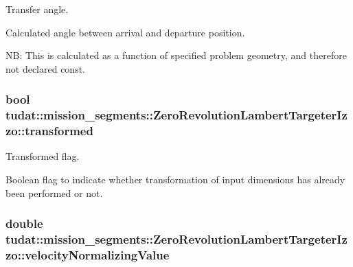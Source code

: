 Transfer angle. 

Calculated angle between arrival and departure position.

NB\+: This is calculated as a function of specified problem geometry, and therefore not declared const. 
\subsubsection[{\texorpdfstring{transformed}{transformed}}]{\setlength{\rightskip}{0pt plus 5cm}bool tudat\+::mission\+\_\+segments\+::\+Zero\+Revolution\+Lambert\+Targeter\+Izzo\+::transformed\hspace{0.3cm}{\ttfamily [protected]}}\hypertarget{classtudat_1_1mission__segments_1_1ZeroRevolutionLambertTargeterIzzo_a0151916d269a7449fbabe7693707cb70}{}\label{classtudat_1_1mission__segments_1_1ZeroRevolutionLambertTargeterIzzo_a0151916d269a7449fbabe7693707cb70}


Transformed flag. 

Boolean flag to indicate whether transformation of input dimensions has already been performed or not. 
\subsubsection[{\texorpdfstring{velocity\+Normalizing\+Value}{velocityNormalizingValue}}]{\setlength{\rightskip}{0pt plus 5cm}double tudat\+::mission\+\_\+segments\+::\+Zero\+Revolution\+Lambert\+Targeter\+Izzo\+::velocity\+Normalizing\+Value\hspace{0.3cm}{\ttfamily [protected]}}\hypertarget{classtudat_1_1mission__segments_1_1ZeroRevolutionLambertTargeterIzzo_a80c3e081aeae5eea4d18bf4ef4164f2d}{}\label{classtudat_1_1mission__segments_1_1ZeroRevolutionLambertTargeterIzzo_a80c3e081aeae5eea4d18bf4ef4164f2d}


